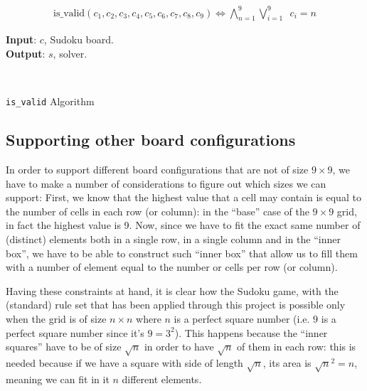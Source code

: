 \documentclass[]{usiinfprospectus}
\newcounter{row}
\newcounter{col}
\begin{document}
\begin{align*}
\text{is\_valid}\left(  c_1,  c_2,  c_3,  c_4,  c_5,  c_6,  c_7,  c_8,  c_9
	\right) \Leftrightarrow \bigwedge^9_{n=1}  \bigvee^9_{i=1} \,\,\, c_i = n
\end{align*}

\begin{algorithm}[H]
\hspace*{\algorithmicindent} \textbf{Input}: $c$, Sudoku board. \\
\hspace*{\algorithmicindent} \textbf{Output}: $s$, solver.
\begin{algorithmic}[1]\label{algorithm:}
 
\Else
{}
\EndIf
\EndFor
{}
\EndFor
{}
\EndFor\\
\EndFunction
\end{algorithmic}
	\caption {\texttt{is\_valid} Algorithm}
\end{algorithm}

\subsection{Supporting other board configurations}

In order to support different board configurations that are not of size
$ 9 \times 9 $, we have to make a number of considerations to figure out
which sizes we can support:
First, we know that the highest value that a cell may contain is equal to the
number of cells in each row (or column): in the ``base'' case of the
$ 9 \times 9 $ grid, in fact the highest value is 9.
Now, since we have to fit the exact same number of (distinct) elements both
in a single row, in a single column and in the ``inner box'', we have to
be able to construct such ``inner box'' that allow us to fill them with a number
of element equal to the number or cells per row (or column).

Having these constraints at hand, it is clear how the Sudoku game, with the
(standard) rule set that has been applied through this project is possible only
when the grid is of size $ n \times n $ where $ n $ is a perfect square number
(i.e. $ 9 $ is a perfect square number since it's $ 9 = 3^2 $).
This happens because the ``inner squares'' have to be of size $ \sqrt{n} $
in order to have $ \sqrt{n} $ of them in each row: this is needed because
if we have a square with side of length $ \sqrt{n} $, its area is
$ \sqrt{n}^2 = n $, meaning we can fit in it $ n $ different elements.
\end{document}
